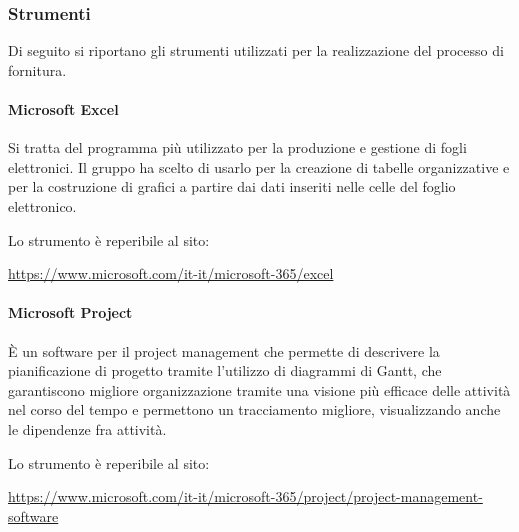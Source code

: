 \subsubsection{Strumenti}
Di seguito si riportano gli strumenti utilizzati per la realizzazione del processo di fornitura.
\paragraph{Microsoft Excel}
Si tratta del programma più utilizzato per la produzione e gestione di fogli elettronici. Il gruppo ha scelto di usarlo per la creazione di tabelle organizzative e per la costruzione di grafici a partire dai dati inseriti nelle celle del foglio elettronico.
\par Lo strumento è reperibile al sito:
\begin{center}
    \url{https://www.microsoft.com/it-it/microsoft-365/excel}
\end{center}

\paragraph{Microsoft Project}
È un software per il project management che permette di descrivere la pianificazione di progetto tramite l'utilizzo di diagrammi di Gantt, che garantiscono migliore organizzazione tramite una visione più efficace delle attività nel corso del tempo e permettono un tracciamento migliore, visualizzando anche le dipendenze fra attività.
\par Lo strumento è reperibile al sito:
\begin{center}
    \url{https://www.microsoft.com/it-it/microsoft-365/project/project-management-software}
\end{center}

